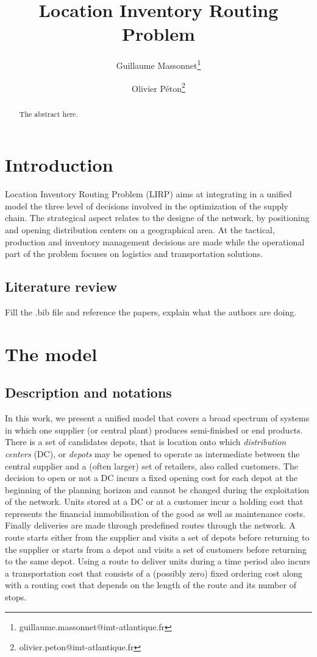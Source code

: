 \documentclass[10pt, a4paper]{article}
\title{Location Inventory Routing Problem}
\author[1]{Guillaume Massonnet\thanks{guillaume.massonnet@imt-atlantique.fr}}
\author[1]{Olivier Péton\thanks{olivier.peton@imt-atlantique.fr}}
\affil[1]{IMT Atlantique, LS2N, 4 rue Alfred Kastler, 44300 Nantes, France}
\begin{document}
\maketitle
\begin{abstract}                %
The abstract here. 
\end{abstract}


\section{Introduction}
Location Inventory Routing Problem (LIRP) aims at integrating in a unified model the three level of decisions involved in the optimization of the supply chain. 
The strategical aspect relates to the designe of the network, by positioning and opening distribution centers on a geographical area.
At the tactical, production and inventory management decisions are made while the operational part of the problem focuses on logistics and transportation solutions. 

\subsection{Literature review}
Fill the .bib file and reference the papers, explain what the authors are doing.

\section{The model}
\subsection{Description and notations}
In this work, we present a unified model that covers a broad spectrum of systems in which one supplier (or central plant) produces semi-finished or end products. 
There is a set of candidates depots, that is location onto which {\em distribution centers} (DC), or {\em depots} may be opened to operate as intermediate between the central supplier and a (often larger) set of retailers, also called customers.
The decision to open or not a DC incurs a fixed opening cost for each depot at the beginning of the planning horizon and cannot be changed during the exploitation of the network.
Units stored at a DC or at a customer incur a holding cost that represents the financial immobilisation of the good as well as maintenance costs.
Finally deliveries are made through predefined routes through the network. A route starts either from the supplier and visits a set of depots before returning to the supplier or starts from a depot and visits a set of customers before returning to the same depot. 
Using a route to deliver units during a time period also incurs a transportation cost that consists of a (possibly zero) fixed ordering cost along with a routing cost that depends on the length of the route and its number of stops.
\end{document}

